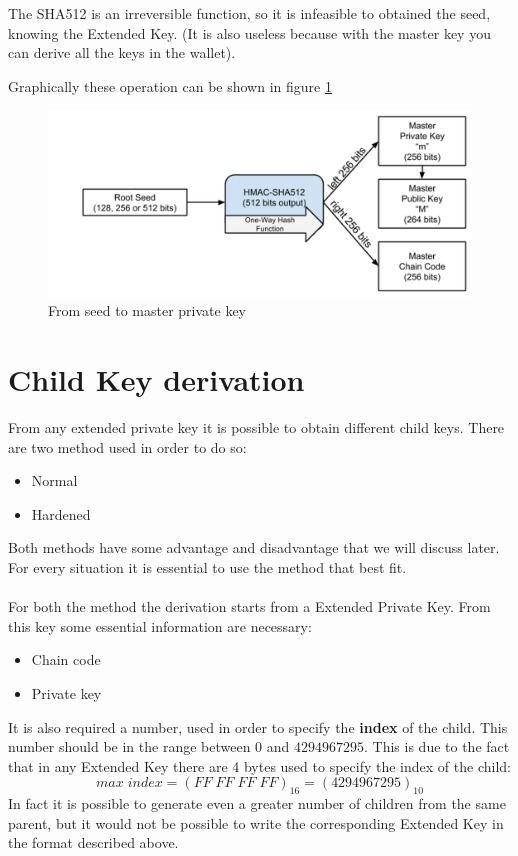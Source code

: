\begin{remark}
	The SHA512 is an irreversible function, so it is infeasible to obtained the seed, knowing the Extended Key. (It is also useless because with the master key you can derive all the keys in the wallet).
\end{remark}

\begin{flushleft}
	Graphically these operation can be shown in figure \ref{fig:From seed to master private key}
\end{flushleft}

\begin{figure}[ht!]
	\centering
	\includegraphics[width=13cm]{Figures/seed_to_xprv.png}
	\caption{From seed to master private key}
	\label{fig:From seed to master private key}
\end{figure}


\section{Child Key derivation}
From any extended private key it is possible to obtain different child keys. There are two method used in order to do so:
\begin{itemize}
	\item Normal
	\item Hardened
\end{itemize}
Both methods have some advantage and disadvantage that we will discuss later. For every situation it is essential to use the method that best fit.
\\ \\
For both the method the derivation starts from a Extended Private Key. From this key some essential information are necessary:
\begin{itemize}[label=$\star$]
	\item Chain code
	\item Private key
\end{itemize}
It is also required a number, used in order to specify the \textbf{index} of the child. This number should be in the range between $0$ and $4294967295$. This is due to the fact that in any Extended Key there are 4 bytes used to specify the index of the child:
\begin{equation*}
	max \; index=(FF\;FF\;FF\;FF)_{16} = (4294967295)_{10}
\end{equation*}
In fact it is possible to generate even a greater number of children from the same parent, but it would not be possible to write the corresponding Extended Key in the format described above.


